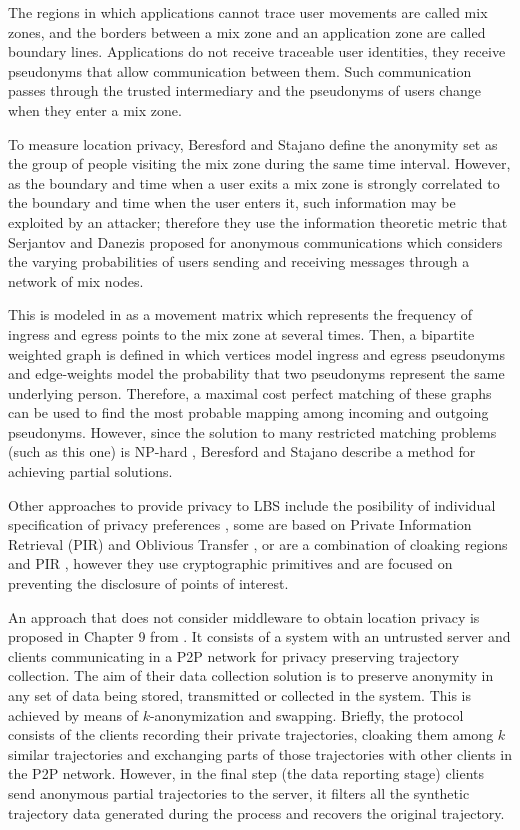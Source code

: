 \documentclass[review]{elsarticle}
\begin{document}
The regions in which applications cannot trace user movements are called mix zones, and the borders between a mix zone and an application zone are called boundary lines.
Applications do not receive traceable user identities, they receive pseudonyms that allow communication between them. Such communication passes through the trusted intermediary and the pseudonyms of users change when they enter a mix zone.


To measure location privacy, Beresford and Stajano \cite{Beresford04mixzones} define the anonymity set as the group of people visiting the mix zone during the same time interval. However, as the boundary and time when a user exits a mix zone is strongly correlated to the boundary and time when the user enters it, such information may be exploited by an attacker; therefore they use the information theoretic metric that Serjantov and Danezis \cite{Serjantov2002} proposed for anonymous communications which considers the varying probabilities of users sending and receiving messages through a network of mix nodes.


This is modeled in \cite{Beresford04mixzones} as a movement matrix which represents the frequency of ingress and egress points to the mix zone at several times.
Then, a bipartite weighted graph is defined in which vertices model ingress and egress pseudonyms and edge-weights
model the probability that two pseudonyms represent the same underlying person. Therefore, a maximal cost perfect matching of these graphs can be used to find the most probable mapping among incoming and outgoing pseudonyms.  
However, since the solution to many restricted matching problems (such as this one) is NP-hard \cite{Tanimoto1978}, Beresford and Stajano \cite{Beresford04mixzones} describe a method for achieving partial solutions.

Other approaches to provide privacy to LBS include the posibility of individual specification of privacy preferences \cite{Damiani:2009}, some are based on Private Information Retrieval (PIR) and Oblivious Transfer \cite{Paulet:2014}, or are a combination of cloaking regions and PIR \cite{Ghinita:2011}, however they use cryptographic primitives and are focused on preventing the disclosure of points of interest.

An approach that does not consider middleware to obtain location privacy is proposed in Chapter 9 from \cite{Gidofalvi2007}. It consists of a system with an untrusted server and clients communicating in a P2P network for privacy preserving trajectory collection.
The aim of their data collection solution is to preserve anonymity in any set of data being stored, transmitted or
collected in the system. This is achieved by means of $k$-anonymization and swapping.
Briefly, the protocol consists of the clients recording their private trajectories, cloaking them among $k$ similar trajectories and exchanging parts of those trajectories with other clients in the P2P network. However, in the final step (the data reporting stage) clients send anonymous partial trajectories to the server, it filters all the synthetic trajectory data generated during the process and recovers the original trajectory.
\end{document}
